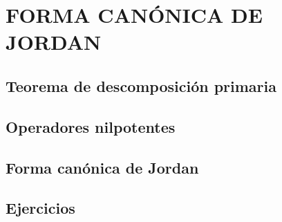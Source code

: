 \chapter{FORMA CANÓNICA DE JORDAN}
\printchaptertableofcontents

\section{Teorema de descomposición primaria}

\section{Operadores nilpotentes}

\section{Forma canónica de Jordan}

\section{Ejercicios}